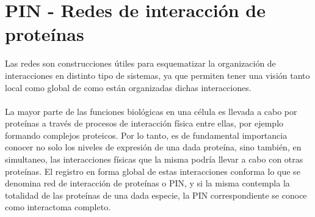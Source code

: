 \section{PIN - Redes de interacción de proteínas}
\label{sec:redes}
Las redes son construcciones útiles para esquematizar la organización de interacciones en distinto tipo de sistemas, ya que permiten tener una visión tanto local como global de como están organizadas dichas interacciones.\\\\
La mayor parte de las funciones biológicas en una célula es llevada a cabo por proteínas a través de procesos de interacción física entre ellas, por ejemplo formando complejos proteicos. Por lo tanto, es de fundamental importancia conocer no solo los niveles de expresión de una dada proteína, sino también, en simultaneo, las interacciones físicas que la misma podría llevar a cabo con otras proteínas. El registro en forma global de estas interacciones conforma lo que se denomina red de interacción de proteínas o PIN, y si la misma contempla la totalidad de las proteínas de una dada especie, la PIN correspondiente se conoce como interactoma completo.\\\\
